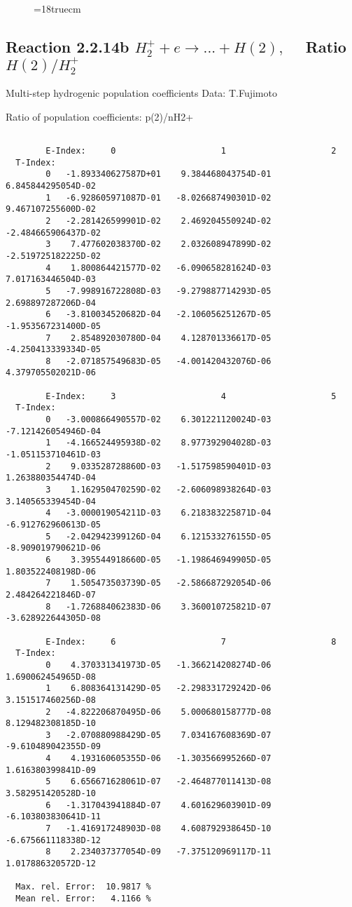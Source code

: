 \begin{figure} \label{2.2.14a}
\epsfxsize=18truecm
\end{figure}
\newpage

\subsection{
Reaction 2.2.14b $ H_2^+ + e \rightarrow ...+ H(2) , \quad  $
Ratio $H(2)/H_2^+  $
}

 Multi-step hydrogenic population coefficients
 Data: T.Fujimoto

 Ratio of population coefficients: p(2)/nH2+

\begin{verbatim}

        E-Index:     0                     1                     2
  T-Index:
        0   -1.893340627587D+01    9.384468043754D-01    6.845844295054D-02
        1   -6.928605971087D-01   -8.026687490301D-02    9.467107255600D-02
        2   -2.281426599901D-02    2.469204550924D-02   -2.484665906437D-02
        3    7.477602038370D-02    2.032608947899D-02   -2.519725182225D-02
        4    1.800864421577D-02   -6.090658281624D-03    7.017163446504D-03
        5   -7.998916722808D-03   -9.279887714293D-05    2.698897287206D-04
        6   -3.810034520682D-04   -2.106056251267D-05   -1.953567231400D-05
        7    2.854892030780D-04    4.128701336617D-05   -4.250413339334D-05
        8   -2.071857549683D-05   -4.001420432076D-06    4.379705502021D-06

        E-Index:     3                     4                     5
  T-Index:
        0   -3.000866490557D-02    6.301221120024D-03   -7.121426054946D-04
        1   -4.166524495938D-02    8.977392904028D-03   -1.051153710461D-03
        2    9.033528728860D-03   -1.517598590401D-03    1.263880354474D-04
        3    1.162950470259D-02   -2.606098938264D-03    3.140565339454D-04
        4   -3.000019054211D-03    6.218383225871D-04   -6.912762960613D-05
        5   -2.042942399126D-04    6.121533276155D-05   -8.909019790621D-06
        6    3.395544918660D-05   -1.198646949905D-05    1.803522408198D-06
        7    1.505473503739D-05   -2.586687292054D-06    2.484264221846D-07
        8   -1.726884062383D-06    3.360010725821D-07   -3.628922644305D-08

        E-Index:     6                     7                     8
  T-Index:
        0    4.370331341973D-05   -1.366214208274D-06    1.690062454965D-08
        1    6.808364131429D-05   -2.298331729242D-06    3.151517460256D-08
        2   -4.822206870495D-06    5.000680158777D-08    8.129482308185D-10
        3   -2.070880988429D-05    7.034167608369D-07   -9.610489042355D-09
        4    4.193160605355D-06   -1.303566995266D-07    1.616380399841D-09
        5    6.656671628061D-07   -2.464877011413D-08    3.582951420528D-10
        6   -1.317043941884D-07    4.601629603901D-09   -6.103803830641D-11
        7   -1.416917248903D-08    4.608792938645D-10   -6.675661118338D-12
        8    2.234037377054D-09   -7.375120969117D-11    1.017886320572D-12

  Max. rel. Error:  10.9817 %
  Mean rel. Error:   4.1166 %


\end{verbatim}
